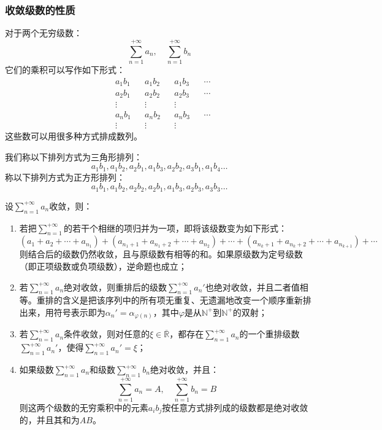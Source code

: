 \subsubsection{收敛级数的性质}
对于两个无穷级数：
\begin{equation*}
	\sum_{n=1}^{+\infty}a_n,\quad\sum_{n=1}^{+\infty}b_n
\end{equation*}
它们的乘积可以写作如下形式：
\begin{equation*}
	\begin{aligned}
		&a_1b_1	 &&a_1b_2	&&a_1b_3	&&\cdots\\
		&a_2b_1	 &&a_2b_2	&&a_2b_3	&&\cdots\\
		&\vdots	 &&\vdots	&&\vdots\\
		&a_nb_1	 &&a_nb_2	&&a_nb_3	&&\cdots\\
		&\vdots	 &&\vdots	&&\vdots
	\end{aligned}
\end{equation*}
这些数可以用很多种方式排成数列。\par
我们称以下排列方式为三角形排列：
\begin{equation*}
	a_1b_1,a_1b_2,a_2b_1,a_1b_3,a_2b_2,a_3b_1,a_1b_4\dots
\end{equation*}
称以下排列方式为正方形排列：
\begin{equation*}
	a_1b_1,a_1b_2,a_2b_2,a_2b_1,a_1b_3,a_2b_3,a_3b_3\dots
\end{equation*}
\begin{property}\label{prop:ConvergentSeries}
	设$\sum\limits_{n=1}^{+\infty}a_n$收敛，则：
	\begin{enumerate}
		\item 若把$\sum\limits_{n=1}^{+\infty}$的若干个相继的项归并为一项，即将该级数变为如下形式：
		\begin{equation*}
			(a_1+a_2+\cdots+a_{n_1})+(a_{n_1+1}+a_{n_1+2}+\cdots+a_{n_2})+\cdots+(a_{n_k+1}+a_{n_k+2}+\cdots+a_{n_{k+1}})+\cdots
		\end{equation*}
		则结合后的级数仍然收敛，且与原级数有相等的和。如果原级数为定号级数（即正项级数或负项级数），逆命题也成立；
		\item 若$\sum\limits_{n=1}^{+\infty}a_n$绝对收敛，则重排后的级数$\sum\limits_{n=1}^{+\infty}a_n'$也绝对收敛，并且二者值相等。重排的含义是把该序列中的所有项无重复、无遗漏地改变一个顺序重新排出来，用符号表示即为$\alpha_n'=\alpha_{\varphi(n)}$，其中$\varphi$是从$\mathbb{N}^+$到$\mathbb{N}^+$的双射；
		\item 若$\sum\limits_{n=1}^{+\infty}a_n$条件收敛，则对任意的$\xi\in\overline{\mathbb{R}}$，都存在$\sum\limits_{n=1}^{+\infty}a_n$的一个重排级数$\sum\limits_{n=1}^{+\infty}a_n'$，使得$\sum\limits_{n=1}^{+\infty}a_n'=\xi$；
		\item 如果级数$\sum\limits_{n=1}^{+\infty}a_n$和级数$\sum\limits_{n=1}^{+\infty}b_n$绝对收敛，并且：
		\begin{equation*}
			\sum_{n=1}^{+\infty}a_n=A,\quad\sum_{n=1}^{+\infty}b_n=B
		\end{equation*}
		则这两个级数的无穷乘积中的元素$a_ib_j$按任意方式排列成的级数都是绝对收敛的，并且其和为$AB$。
	\end{enumerate}
\end{property}
